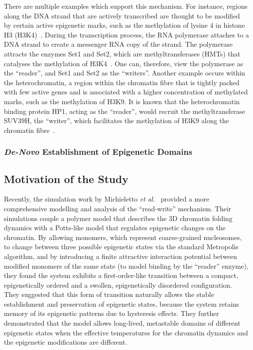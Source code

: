 \documentclass[12pt]{article}
\newcommand{\etal}{\emph{et al.}}
\begin{document}
There are multiple examples which support this mechanism. For instance, regions along the DNA strand that are actively transcribed are thought to be modified by certain active epigenetic marks, such as the methylation of lysine 4 in histone H3 (H3K4)~\cite{zentner2013}. During the transcription process, the RNA polymerase attaches to a DNA strand to create a messenger RNA copy of the strand. The polymerase attracts the enzymes Set1 and Set2, which are methyltransferases (HMTs) that catalyses the methylation of H3K4~\cite{zentner2013, ruthenburgh2007}. One can, therefore, view the polymerase as the ``reader'', and Set1 and Set2 as the ``writers''. Another example occurs within the heterochromatin, a region within the chromatin fibre that is tightly packed with few active genes and is associated with a higher concentration of methylated marks, such as the methylation of H3K9. It is known that the heterochromatin binding protein HP1, acting as the ``reader'', would recruit the methyltransferase SUV39H, the ``writer'', which facilitates the methylation of H3K9 along the chromatin fibre~\cite{zentner2013}.

\subsubsection{\emph{De-Novo} Establishment of Epigenetic Domains}

\subsection{Motivation of the Study}
Recently, the simulation work by Michieletto \etal~\cite{michieletto2016} provided a more comprehensive modelling and analysis of the ``read-write'' mechanism. Their simulations couple a polymer model that describes the 3D chromatin folding dynamics with a Potts-like model that regulates epigenetic changes on the chromatin.  By allowing monomers, which represent coarse-grained nucleosomes, to change between three possible epigenetic states via the standard Metropolis algorithm, and by introducing a finite attractive interaction potential between modified monomers of the same state (to model binding by the ``reader'' enzyme), they found the system exhibits a first-order-like transition between a compact, epigenetically ordered and a swollen, epigenetically disordered configuration. They suggested that this form of transition naturally allows the stable establishment and preservation of epigenetic states, because the system retains memory of its epigenetic patterns due to hysteresis effects. They further demonstrated that the model allows long-lived, metastable domains of different epigenetic states when the effective temperatures for the chromatin dynamics and the epigenetic modifications are different. 
\end{document}
